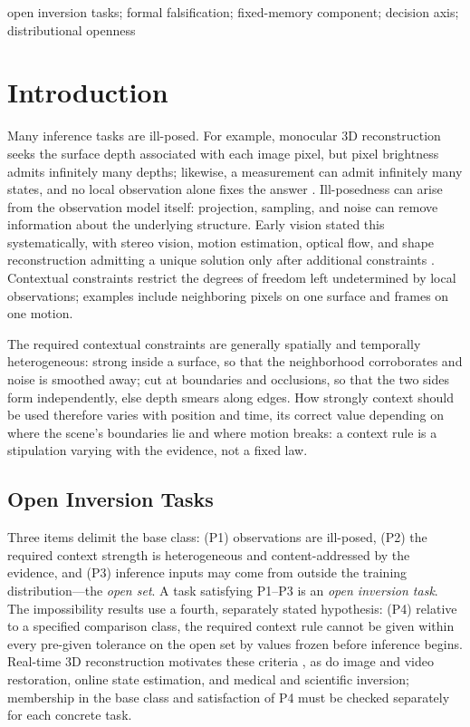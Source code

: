 \documentclass[twoside,11pt]{article}
\begin{document}
\begin{keywords}
  open inversion tasks; formal falsification; fixed-memory component; decision axis; distributional openness
\end{keywords}

\section{Introduction}
\label{ch:intro}

Many inference tasks are ill-posed. For example, monocular 3D reconstruction seeks the surface depth associated with each image pixel, but pixel brightness admits infinitely many depths; likewise, a measurement can admit infinitely many states, and no local observation alone fixes the answer \citep{hadamard1902}. Ill-posedness can arise from the observation model itself: projection, sampling, and noise can remove information about the underlying structure. Early vision stated this systematically, with stereo vision, motion estimation, optical flow, and shape reconstruction admitting a unique solution only after additional constraints \citep{poggio1985}. Contextual constraints restrict the degrees of freedom left undetermined by local observations; examples include neighboring pixels on one surface and frames on one motion.

The required contextual constraints are generally spatially and temporally heterogeneous: strong inside a surface, so that the neighborhood corroborates and noise is smoothed away; cut at boundaries and occlusions, so that the two sides form independently, else depth smears along edges. How strongly context should be used therefore varies with position and time, its correct value depending on where the scene's boundaries lie and where motion breaks: a context rule is a stipulation varying with the evidence, not a fixed law.

\subsection{Open Inversion Tasks}

Three items delimit the base class: (P1) observations are ill-posed, (P2) the required context strength is heterogeneous and content-addressed by the evidence, and (P3) inference inputs may come from outside the training distribution---the \emph{open set}. A task satisfying P1--P3 is an \emph{open inversion task}. The impossibility results use a fourth, separately stated hypothesis: (P4) relative to a specified comparison class, the required context rule cannot be given within every pre-given tolerance on the open set by values frozen before inference begins. Real-time 3D reconstruction motivates these criteria \citep{kerbl2023}, as do image and video restoration, online state estimation, and medical and scientific inversion; membership in the base class and satisfaction of P4 must be checked separately for each concrete task.
\end{document}
